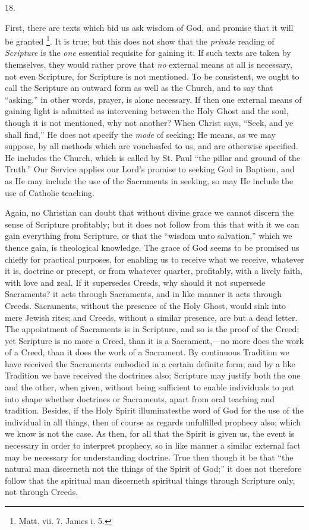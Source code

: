 18.

First, there are texts which bid us ask wisdom of God, and promise
that it will be granted \footnote{Matt. vii. 7. James i. 5.}.
It is true; but this does not show that the \emph{private} reading of \emph{Scripture}
is the \emph{one} essential requisite for gaining it. If such texts
are taken by themselves, they would rather prove that \emph{no}
external means at all is necessary, not even Scripture, for Scripture
is not mentioned. To be consistent, we ought to call the Scripture an
outward form as well as the Church, and to say that
``asking,'' in other words, prayer, is alone necessary. If
then one external means of gaining light is admitted as
intervening between the Holy Ghost and the soul, though it is not
mentioned, why not another? When Christ says, ``Seek, and ye shall
find,'' He does not specify the \emph{mode} of seeking; He means,
as we may suppose, by all methods which are vouchsafed to us, and are
otherwise specified. He includes the Church, which is called by St.
Paul ``the pillar and ground of the Truth.'' Our Service
applies our Lord's promise to seeking God in Baptism, and as He may
include the use of the Sacraments in seeking, so may He include the
use of Catholic teaching.

Again, no Christian can doubt that without divine grace we cannot
discern the sense of Scripture profitably; but it does not follow from
this that with it we can gain everything from Scripture, or that the
``wisdom unto salvation,'' which we thence gain, is
theological knowledge. The grace of God seems to be promised us
chiefly for practical purposes, for enabling us to receive what we
receive, whatever it is, doctrine or precept, or from whatever
quarter, profitably, with a lively faith, with love and zeal. If it
supersedes Creeds, why should it not supersede Sacraments? it acts
through Sacraments, and in like manner it acts through Creeds.
Sacraments, without the presence of the Holy Ghost, would sink into
mere Jewish rites; and Creeds, without a similar presence, are but a
dead letter. The appointment of Sacraments is in Scripture, and so is
the proof of the Creed; yet Scripture is no more a Creed, than it is a
Sacrament,—no more does the work of a Creed, than it does the work
of a Sacrament. By continuous Tradition we have received the
Sacraments embodied in a certain definite form; and by a like
Tradition we have received the doctrines also; Scripture may justify
both the one and the other, when given, without being sufficient to
enable individuals to put into shape whether doctrines or Sacraments,
apart from oral teaching and tradition. Besides, if the Holy Spirit
illuminatesthe word of God for the use of the individual in all
things, then of course as regards unfulfilled prophecy also; which we
know is not the case. As then, for all that the Spirit is given us,
the event is necessary in order to interpret prophecy, so in like
manner a similar external fact may be necessary for understanding
doctrine. True then though it be that ``the natural man discerneth
not the things of the Spirit of God;'' it does not therefore
follow that the spiritual man discerneth spiritual things through
Scripture only, not through Creeds.

